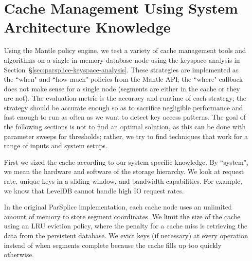 %
%
%
%

\section{Cache Management Using System Architecture Knowledge}
\label{sec:arch-specific}

Using the Mantle policy engine, we test a variety of cache management tools and
algorithms on a single in-memory database node using the keyspace analysis in
Section~\S\ref{sec:parsplice-keyspace-analysis}. These strategies are
implemented as the ``when" and ``how much" policies from the Mantle API; the
``where" callback does not make sense for a single node (segments are either in
the cache or they are not). The evaluation metric is the accuracy and runtime
of each strategy; the strategy should be accurate enough so as to sacrifice
negligible performance and fast enough to run as often as we want to detect key
access patterns. The goal of the following sections is not to find an optimal
solution, as this can be done with parameter sweeps for thresholds; rather, we
try to find techniques that work for a range of inputs and system setups.

First we sized the cache according to our system specific knowledge. By
``system", we mean the hardware and software of the storage hierarchy. We look
at request rate, unique keys in a sliding window, and bandwidth capabilities. For
example, we know that LevelDB cannot handle high IO request rates.

In the original ParSplice implementation, each cache node uses an unlimited
amount of memory to store segment coordinates. We limit the size of the cache
using an LRU eviction policy, where the penalty for a cache miss is retrieving
the data from the persistent database.  We evict keys (if necessary) at every
operation instead of when segments complete because the cache fills up too
quickly otherwise.

